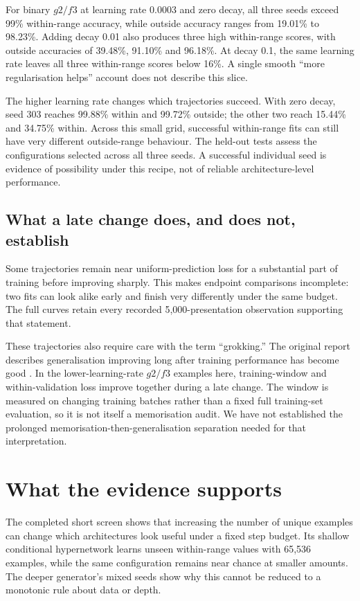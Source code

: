 \documentclass{article}
\begin{document}
For binary $g2/f3$ at learning rate 0.0003 and zero decay, all three seeds exceed
99\% within-range accuracy, while outside accuracy ranges from 19.01\% to 98.23\%.
Adding decay 0.01 also produces three high within-range scores, with outside
accuracies of 39.48\%, 91.10\% and 96.18\%. At decay 0.1, the same learning rate
leaves all three within-range scores below 16\%. A single smooth ``more
regularisation helps'' account does not describe this slice.

The higher learning rate changes which trajectories succeed. With zero decay,
seed 303 reaches 99.88\% within and 99.72\% outside; the other two reach 15.44\%
and 34.75\% within. Across this small grid, successful within-range fits can still
have very different outside-range behaviour. The held-out tests assess the
configurations selected across all three seeds. A successful individual seed is
evidence of possibility under this recipe, not of reliable architecture-level performance.

\subsection{What a late change does, and does not, establish}
Some trajectories remain near uniform-prediction loss for a substantial part of
training before improving sharply. This makes endpoint comparisons incomplete:
two fits can look alike early and finish very differently under the same budget.
The full curves retain every recorded 5,000-presentation observation supporting
that statement.

These trajectories also require care with the term ``grokking.'' The original
report describes generalisation improving long after training performance has
become good \cite{grokking}. In the lower-learning-rate $g2/f3$ examples here,
training-window and within-validation loss improve together during a late change.
The window is measured on changing training batches rather than a fixed full
training-set evaluation, so it is not itself a memorisation audit. We have not
established the prolonged memorisation-then-generalisation separation needed for
that interpretation.

\newpage
\section{What the evidence supports}
The completed short screen shows that increasing the number of unique examples
can change which architectures look useful under a fixed step budget. Its shallow
conditional hypernetwork learns unseen within-range values with 65,536 examples,
while the same configuration remains near chance at smaller amounts. The deeper
generator's mixed seeds show why this cannot be reduced to a monotonic rule about
data or depth.
\end{document}
